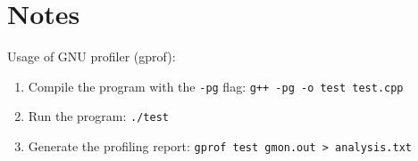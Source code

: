 \documentclass[color]{article}
\begin{document}
\section{Notes}

Usage of GNU profiler (gprof):
\begin{enumerate}
    \item Compile the program with the \texttt{-pg} flag: \texttt{g++ -pg -o test test.cpp}
    \item Run the program: \texttt{./test}
    \item Generate the profiling report: \texttt{gprof test gmon.out > analysis.txt}
\end{enumerate}
\end{document}
